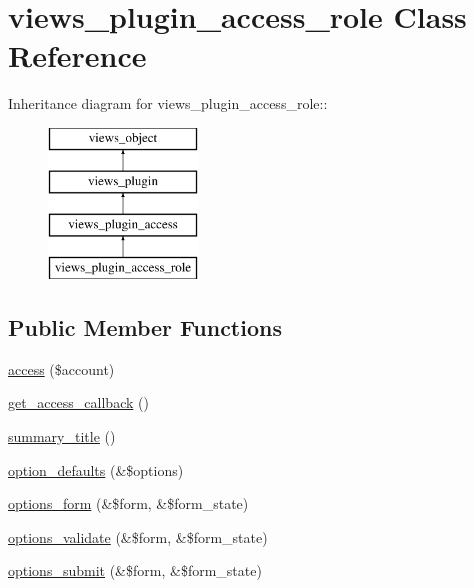 \hypertarget{classviews__plugin__access__role}{
\section{views\_\-plugin\_\-access\_\-role Class Reference}
\label{classviews__plugin__access__role}
}
Inheritance diagram for views\_\-plugin\_\-access\_\-role::\begin{figure}[H]
\begin{center}
\leavevmode
\includegraphics[height=4cm]{classviews__plugin__access__role}
\end{center}
\end{figure}
\subsection*{Public Member Functions}
\begin{CompactItemize}
\item 
\hyperlink{classviews__plugin__access__role_8de6032d940b90e06820cdbd9a15a51c}{access} (\$account)
\item 
\hyperlink{classviews__plugin__access__role_50094384e297acdd629d9462004df69a}{get\_\-access\_\-callback} ()
\item 
\hyperlink{classviews__plugin__access__role_25dbbc0f06093f0e4ee13182ea0d277f}{summary\_\-title} ()
\item 
\hyperlink{classviews__plugin__access__role_337043de2f34f2e861058d3584286499}{option\_\-defaults} (\&\$options)
\item 
\hyperlink{classviews__plugin__access__role_76293d33e84a78e2ce0df6df955da760}{options\_\-form} (\&\$form, \&\$form\_\-state)
\item 
\hyperlink{classviews__plugin__access__role_82fda91cd55acbbcac1759448c8fc471}{options\_\-validate} (\&\$form, \&\$form\_\-state)
\item 
\hyperlink{classviews__plugin__access__role_d9bf6eddd91a7c224fb813a58077ee4d}{options\_\-submit} (\&\$form, \&\$form\_\-state)
\end{CompactItemize}


